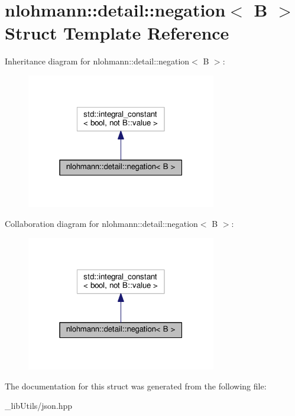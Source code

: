 \hypertarget{structnlohmann_1_1detail_1_1negation}{}\section{nlohmann\+:\+:detail\+:\+:negation$<$ B $>$ Struct Template Reference}
\label{structnlohmann_1_1detail_1_1negation}


Inheritance diagram for nlohmann\+:\+:detail\+:\+:negation$<$ B $>$\+:\nopagebreak
\begin{figure}[H]
\begin{center}
\leavevmode
\includegraphics[width=235pt]{structnlohmann_1_1detail_1_1negation__inherit__graph}
\end{center}
\end{figure}


Collaboration diagram for nlohmann\+:\+:detail\+:\+:negation$<$ B $>$\+:\nopagebreak
\begin{figure}[H]
\begin{center}
\leavevmode
\includegraphics[width=235pt]{structnlohmann_1_1detail_1_1negation__coll__graph}
\end{center}
\end{figure}


The documentation for this struct was generated from the following file\+:\begin{DoxyCompactItemize}
\item 
\+\_\+lib\+Utils/json.\+hpp\end{DoxyCompactItemize}
